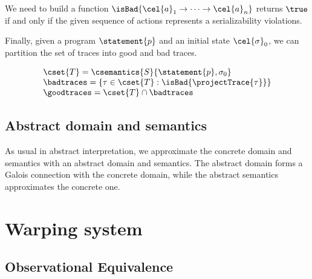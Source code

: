 We need to build a function $\isBad{\cel{a}_1 \to \cdots \to \cel{a}_n}$ returns $\true$ if and only if the given sequence of actions represents a serializability violations.

Finally, given a program $\statement{p}$ and an initial state $\cel{\sigma}_0$, we can partition the set of traces into good and bad traces.

\[
\begin{array}{l}
\cset{T}=\csemantics{S}{\statement{p}, \sigma_0}\\
\badtraces = \{\tau \in \cset{T} : \isBad{\projectTrace{\tau}}\}\\
\goodtraces = \cset{T} \cap \badtraces\\
\end{array}
\]

%
%


\subsection{Abstract domain and semantics}
As usual in abstract interpretation, we approximate the concrete domain and semantics with an abstract domain and semantics. The abstract domain forms a Galois connection with the concrete domain, while the abstract semantics approximates the concrete one. 

\section{Warping system}


\subsection{Observational Equivalence}

